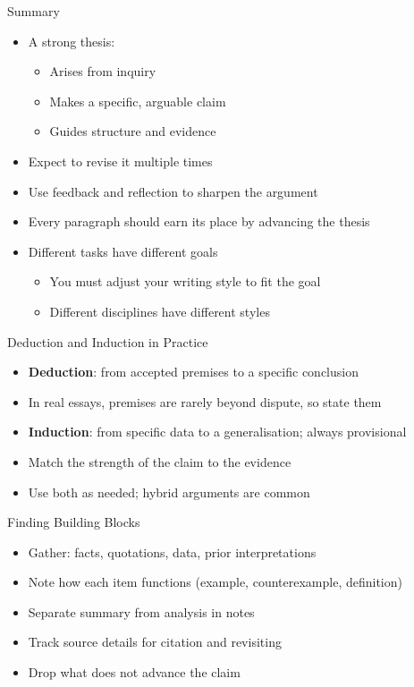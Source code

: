 \documentclass[aspectratio=169]{beamer}
\begin{document}
\begin{frame}{Summary}
\begin{itemize}
  \item A strong thesis:
    \begin{itemize}
      \item Arises from inquiry
      \item Makes a specific, arguable claim
      \item Guides structure and evidence
    \end{itemize}
  \item Expect to revise it multiple times
  \item Use feedback and reflection to sharpen the argument
  \item Every paragraph should earn its place by advancing the thesis
  \item Different tasks have different goals
    \begin{itemize}
    \item You must adjust your writing style to fit the goal
    \item Different disciplines have different styles
    \end{itemize}
\end{itemize}
\end{frame}

\begin{frame}{Deduction and Induction in Practice}
\begin{itemize}
  \item \textbf{Deduction}: from accepted premises to a specific conclusion
  \item[$\Rightarrow$] In real essays, premises are rarely beyond dispute, so state them
  \item \textbf{Induction}: from specific data to a generalisation; always provisional
  \item[$\Rightarrow$] Match the strength of the claim to the evidence
  \item Use both as needed; hybrid arguments are common
\end{itemize}
\end{frame}

\begin{frame}{Finding Building Blocks}
\begin{itemize}
  \item Gather: facts, quotations, data, prior interpretations
  \item Note how each item functions (example, counterexample, definition)
  \item Separate summary from analysis in notes
  \item Track source details for citation and revisiting
  \item Drop what does not advance the claim
\end{itemize}
\end{frame}
\end{document}
